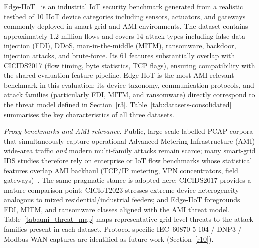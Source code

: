 \documentclass[sensors,article,submit,pdftex,moreauthors]{Definitions/mdpi}
\begin{document}
Edge-IIoT~\cite{edgeiiot2022} is an industrial IoT security benchmark generated from a realistic testbed of 10 IIoT device categories including sensors, actuators, and gateways commonly deployed in smart grid and AMI environments. The dataset contains approximately 1.2 million flows and covers 14 attack types including false data injection (FDI), DDoS, man-in-the-middle (MITM), ransomware, backdoor, injection attacks, and brute-force. Its 61 features substantially overlap with CICIDS2017 (flow timing, byte statistics, TCP flags), ensuring compatibility with the shared evaluation feature pipeline. Edge-IIoT is the most AMI-relevant benchmark in this evaluation: its device taxonomy, communication protocols, and attack families (particularly FDI, MITM, and ransomware) directly correspond to the threat model defined in Section~\ref{r3}. Table~\ref{tab:datasets-consolidated} summarises the key characteristics of all three datasets.

\noindent\textit{Proxy benchmarks and AMI relevance.} Public, large-scale labelled PCAP corpora that simultaneously capture operational Advanced Metering Infrastructure (AMI) wide-area traffic \textit{and} modern multi-family attacks remain scarce; many smart-grid IDS studies therefore rely on enterprise or IoT flow benchmarks whose statistical features overlap AMI backhaul (TCP/IP metering, VPN concentrators, field gateways)~\cite{hamdi2025investigating,buyuktanir2025federated,rehman2024ffl}. The same pragmatic stance is adopted here: CICIDS2017 provides a mature comparison point; CICIoT2023 stresses extreme device heterogeneity analogous to mixed residential/industrial feeders; and Edge-IIoT foregrounds FDI, MITM, and ransomware classes aligned with the AMI threat model. Table~\ref{tab:ami_threat_map} maps representative grid-level threats to the attack families present in each dataset. Protocol-specific IEC~60870-5-104 / DNP3 / Modbus-WAN captures are identified as future work (Section~\ref{r10}).
\end{document}
